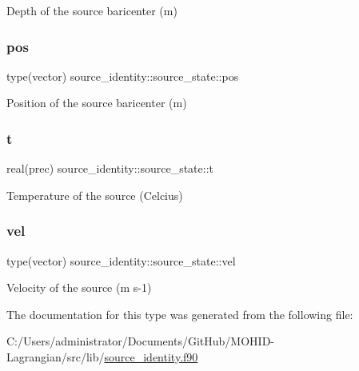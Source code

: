 Depth of the source baricenter (m) 

\mbox{\label{structsource__identity_1_1source__state_a070917562792ada99bdb2eaa2b5274e8}} 
\subsubsection{\texorpdfstring{pos}{pos}}
{\footnotesize\ttfamily type(vector) source\+\_\+identity\+::source\+\_\+state\+::pos\hspace{0.3cm}{\ttfamily [private]}}



Position of the source baricenter (m) 

\mbox{\label{structsource__identity_1_1source__state_ac370880f81e096a7aabb9fca144143fb}} 
\subsubsection{\texorpdfstring{t}{t}}
{\footnotesize\ttfamily real(prec) source\+\_\+identity\+::source\+\_\+state\+::t\hspace{0.3cm}{\ttfamily [private]}}



Temperature of the source (Celcius) 

\mbox{\label{structsource__identity_1_1source__state_aea32db0332ef565f04ab210f5b17dba1}} 
\subsubsection{\texorpdfstring{vel}{vel}}
{\footnotesize\ttfamily type(vector) source\+\_\+identity\+::source\+\_\+state\+::vel\hspace{0.3cm}{\ttfamily [private]}}



Velocity of the source (m s-\/1) 



The documentation for this type was generated from the following file\+:\begin{DoxyCompactItemize}
\item 
C\+:/\+Users/administrator/\+Documents/\+Git\+Hub/\+M\+O\+H\+I\+D-\/\+Lagrangian/src/lib/\hyperlink{source__identity_8f90}{source\+\_\+identity.\+f90}\end{DoxyCompactItemize}
